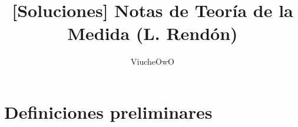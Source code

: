 \documentclass[spanish,12pt,a4paper,openany]{book}
\title{[Soluciones] Notas de Teoría de la Medida (L. Rendón)}
\author{ViucheOwO}
\begin{document}
	\begin{titlepage}
		\maketitle
		
		
	\end{titlepage}
	\tableofcontents
	\chapter{Definiciones preliminares}
\end{document}
